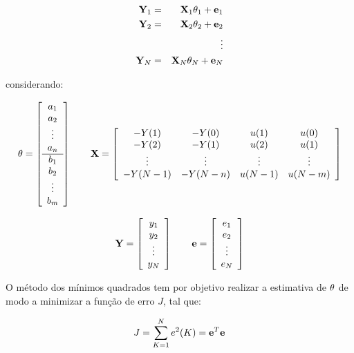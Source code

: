 \begin{eqnarray}
\mathbf{Y}_1 & = & \mathbf{X}_1\mathbf{\theta}_1 + \mathbf{e}_1\nonumber\\
\mathbf{Y}_2 & = & \mathbf{X}_2\mathbf{\theta}_2 + \mathbf{e}_2\nonumber\\
& & \vdots\nonumber\\ 
\mathbf{Y}_N & = & \mathbf{X}_N\mathbf{\theta}_N + \mathbf{e}_N\nonumber
\end{eqnarray}

\noindent considerando:

\begin{equation*}
\mathbf{\theta} = \left[
\begin{array}{c}
a_1\\
a_2\\
\vdots\\
a_n\\
\hline
b_1\\
b_2\\
\vdots\\
b_m
\end{array}
\right] \qquad
\mathbf{X} = \left[
\begin{array}{cccc}
-Y(1) & -Y(0) & u(1) & u(0)\\
-Y(2) & -Y(1) & u(2) & u(1)\\
\vdots & \vdots & \vdots & \vdots\\
-Y(N-1) & -Y(N-n) & u(N-1) & u(N-m)
\end{array}
\right]
\end{equation*}

\begin{equation*}
\mathbf{Y} = \left[
\begin{array}{c}
y_1\\
y_2\\
\vdots\\
y_N
\end{array}
\right] \qquad
\mathbf{e} = \left[
\begin{array}{c}
e_1\\
e_2\\
\vdots\\
e_N
\end{array}
\right]
\end{equation*}

O método dos mínimos quadrados tem por objetivo realizar a estimativa de
$\mathbf{\theta}$ de modo a minimizar a função de erro $J$, tal que:

\begin{equation}
J = \sum_{K = 1}^N e^2(K) = \mathbf{e}^T\mathbf{e}
\end{equation}

